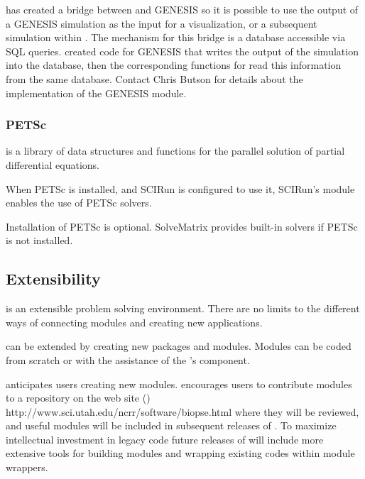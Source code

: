 \sci{} has created a bridge between \SR{} and GENESIS so it is possible
to use the output of a GENESIS simulation as the input for a
visualization, or a subsequent simulation within \BIOPSE{}.  The mechanism for
this bridge is a database accessible via SQL queries.  \sci{} created
code for GENESIS that writes the output of the simulation into the database, then the corresponding functions for \SR{} read this
information from the same database.   Contact Chris Butson
for details about the implementation of the GENESIS module.


\subsubsection{PETSc}

 is a library of
data structures and functions for the parallel solution of partial
differential equations.

When PETSc is installed, and SCIRun is configured to use it, SCIRun's
 module enables the use of PETSc solvers.

Installation of PETSc is optional.  SolveMatrix provides built-in
solvers if PETSc is not installed.


\subsection{Extensibility}
\label{sec:con-extend} 

\SR{} is an extensible  problem solving environment.
There are no limits to the different ways of connecting modules and
creating new applications.

\sr{} can be extended by creating new packages and modules.  Modules
can be coded from scratch or with the assistance of the \sr's
 component.

\sci{} anticipates users creating new modules. \sci{} encourages users
to contribute modules to a repository on the \BIOPSE{} web site
()
{http://www.sci.utah.edu/ncrr/software/biopse.html} where they will be
reviewed, and useful modules will be included in subsequent releases
of \sr{}.  To maximize intellectual investment in legacy code future
releases of \sr{} will include more extensive tools for building
modules and wrapping existing codes within \SR{} module wrappers.

